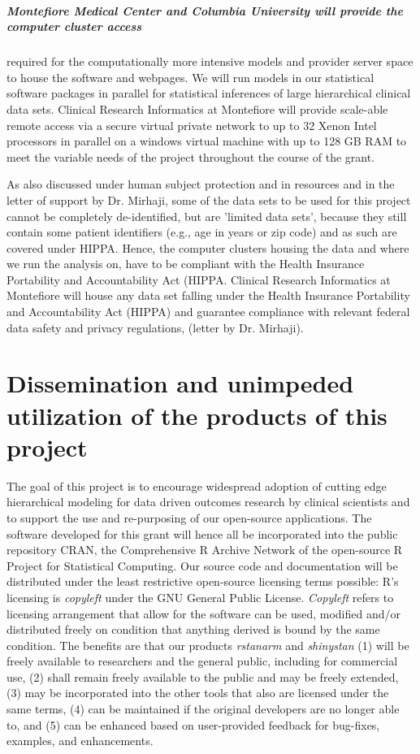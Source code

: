 \documentclass[11pt,notitlepage]{article}
\begin{document}
\subparagraph{Montefiore Medical Center and Columbia University will provide the computer cluster access} required for the computationally more intensive 
models and provider server space to house the software and webpages. We will run models in our statistical software packages in parallel 
for statistical inferences of large hierarchical clinical data sets. Clinical Research Informatics at Montefiore will provide scale-able 
remote access via a secure virtual private network to up to 32 Xenon Intel processors in parallel on a windows virtual machine with up to 
128 GB RAM to meet the variable needs of the project throughout the course of the grant. 

As also discussed under human subject protection and in resources and in the letter of support by Dr. Mirhaji, some of the data sets to 
be used for this project cannot be completely de-identified, but are 'limited data sets', because they still contain some patient 
identifiers (e.g., age in years or zip code) and as such are covered under HIPPA. Hence, the computer clusters housing the data and where 
we run the analysis on, have to be compliant with the Health Insurance Portability and Accountability Act (HIPPA. Clinical Research 
Informatics at Montefiore will house any data set falling under the Health Insurance Portability and Accountability Act (HIPPA) and 
guarantee compliance with relevant federal data safety and privacy regulations, (letter by Dr. Mirhaji). 

\section*{Dissemination and unimpeded utilization of the products of this project}
The goal of this project is to encourage widespread adoption of cutting edge 
hierarchical modeling for data driven outcomes research by clinical scientists and to support the use and re-purposing of our 
open-source applications. The software developed for this grant will hence all be incorporated into the public repository CRAN, 
the Comprehensive R Archive Network of the open-source R Project for Statistical Computing. Our source code and documentation 
will be distributed under the least restrictive open-source licensing terms possible: R's licensing is \textit{copyleft} under the 
GNU General Public License. \textit{Copyleft} refers to licensing arrangement that allow for the software can be used, modified and/or 
distributed freely on condition that anything derived is bound by the same condition. The benefits  are that our products 
\textit{rstanarm} and \textit{shinystan} (1) will be freely available to researchers and the general public, including for commercial use, (2) shall remain freely available to the public and may be freely extended, (3) may be incorporated into the other tools that also are licensed under the same terms, (4) can be maintained if the original developers are no longer able to, and (5) can be enhanced based on user-provided feedback for bug-fixes, examples, and enhancements.
\end{document}
